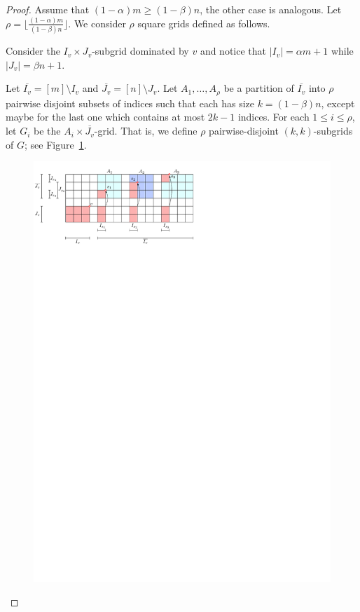\documentclass[a4paper,10pt]{article}
\begin{document}
\begin{proof}
Assume that $(1-\alpha) m \geq (1-\beta)n$, the other case is analogous. 
Let $\rho = \lfloor \frac{(1-\alpha)m}{(1-\beta)n} \rfloor$.
We consider $\rho$ square grids defined as follows. 

Consider the  $I_v\times J_v$-subgrid dominated by $v$ and 
notice that $|I_v| = \alpha m + 1$ while $|J_v| = \beta n + 1$.

Let $\overline{I_v} = [m]\setminus I_v$ and $\overline{J_v} = [n]\setminus J_v$.
Let $A_1, \ldots, A_\rho$ be a partition of $\overline{I_v}$ into $\rho$ pairwise disjoint subsets of indices such that each has size $k = (1-\beta)n$, except maybe for the last one which contains at most $2k-1$ indices.
For each $1\leq i\leq \rho$, let $G_i$ be the $A_i\times \overline{J_v}$-grid. That is, we define $\rho$ pairwise-disjoint $(k, k)$-subgrids of $G$; see Figure~\ref{fig:Expansion Lemma 1}.

\begin{figure}[tb]
\centering
\includegraphics{expansion_lemma_fig1.pdf}
\caption{\small }
\label{fig:Expansion Lemma 1}
\end{figure}


\end{proof}
\end{document}
